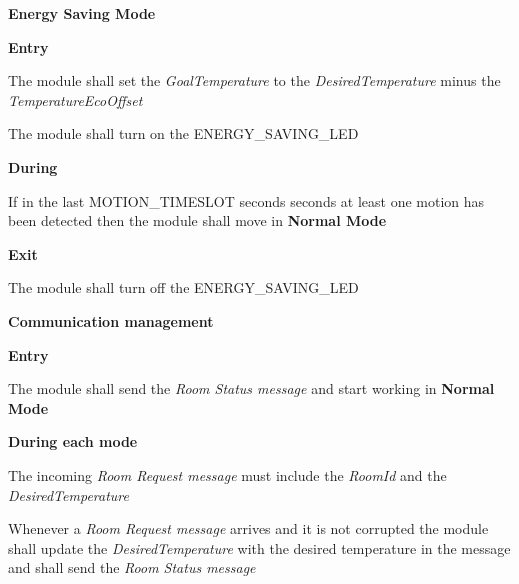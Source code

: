 \begin{req_enum}
\begin{req_enum}[label*=\arabic*.]
					\item \textbf{Energy Saving Mode}
					\begin{req_enum}[label*=\arabic*.]
						\item \textbf{Entry}
							\begin{req_enum}[label*=\arabic*.]
								\item The module shall set the \textit{GoalTemperature} to the \textit{DesiredTemperature} minus the \textit{TemperatureEcoOffset}
								\item The module shall turn on the ENERGY\_SAVING\_LED
							\end{req_enum}
						\item \textbf{During}
							\begin{req_enum}[label*=\arabic*.]
								\item If in the last MOTION\_TIMESLOT seconds  seconds at least one motion has been detected then the module shall move in \textbf{Normal Mode}
							\end{req_enum}
						\item \textbf{Exit}
							\begin{req_enum}[label*=\arabic*.]
								\item The module shall turn off the ENERGY\_SAVING\_LED
							\end{req_enum}
					\end{req_enum}
			
				\end{req_enum}

			\item \textbf{Communication management}
				\begin{req_enum}[label*=\arabic*.]
					\item \textbf{Entry}
					\begin{req_enum}[label*=\arabic*.]
						\item The module shall send the \textit{Room Status message} and start working in \textbf{Normal Mode}
					\end{req_enum}
				
					\item \textbf{During each mode}
					\begin{req_enum}[label*=\arabic*.]
						\item The incoming \textit{Room Request message} must include the \textit{RoomId} and the \textit{DesiredTemperature}
						\item Whenever a \textit{Room Request message} arrives and it is not corrupted the module shall update the \textit{DesiredTemperature} with the desired temperature in the message and shall send the \textit{Room Status message}
					\end{req_enum}
	

\end{req_enum}
\end{req_enum}
